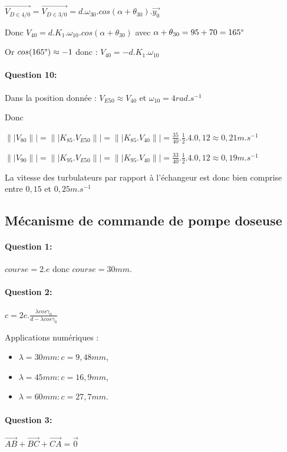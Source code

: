 $\overrightarrow{V_{D\in4/0}}=\overrightarrow{V_{D\in3/0}}=d.\omega_{30}.cos(\alpha+\theta_{30}).\overrightarrow{y_0}$

Donc $V_{40}=d.K_1.\omega_{10}.cos(\alpha+\theta_{30})$ avec $\alpha+\theta_{30}=95+70=165\degree$

Or $cos(165\degree)\approx -1$ donc : $V_{40}=-d.K_1.\omega_{10}$

\paragraph{Question 10:}

Dans la position donnée : $V_{E50}\approx V_{40}$ et $\omega_{10}=4rad.s^{-1}$

Donc

$\||V_{80}\||=\||K_{85}.V_{E50}\||=\||K_{85}.V_{40}\||=\frac{35}{40}.\frac{1}{2}.4.0,12\approx 0,21m.s^{-1}$

$\||V_{90}\||=\||K_{95}.V_{E50}\||=\||K_{95}.V_{40}\||=\frac{33}{40}.\frac{1}{2}.4.0,12\approx 0,19m.s^{-1}$

La vitesse des turbulateurs par rapport à l'échangeur est donc bien comprise entre $0,15$ et $0,25m.s^{-1}$

\subsection{Mécanisme de commande de pompe doseuse}

\paragraph{Question 1:} $course=2.e$ donc $course=30mm$.

\paragraph{Question 2:} $c=2e.\frac{\lambda cos\gamma_0}{d-\lambda cos\gamma_0}$

Applications numériques :
\begin{itemize}
	\item $\lambda = 30 mm : c = 9,48mm$,
	\item $\lambda = 45 mm : c = 16,9 mm$,
	\item $\lambda = 60 mm : c = 27,7 mm$. 
\end{itemize}

\paragraph{Question 3:} $\overrightarrow{AB}+\overrightarrow{BC}+\overrightarrow{CA}=\overrightarrow{0}$

